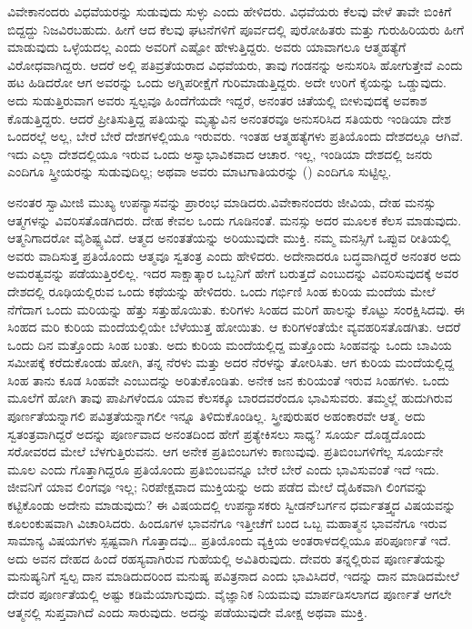  ವಿವೇಕಾನಂದರು ವಿಧವೆಯರನ್ನು ಸುಡುವುದು ಸುಳ್ಳು ಎಂದು ಹೇಳಿದರು. ವಿಧವೆಯರು ಕೆಲವು ವೇಳೆ ತಾವೇ ಬಿಂಕಿಗೆ ಬಿದ್ದದ್ದು ನಿಜವಿರಬಹುದು. ಹೀಗೆ ಆದ ಕೆಲವು ಘಟನೆಗಳಿಗೆ ಪೂರ್ವದಲ್ಲಿ ಪುರೋಹಿತರು ಮತ್ತು ಗುರುಹಿರಿಯರು ಹೀಗೆ ಮಾಡುವುದು ಒಳ್ಳೆಯದಲ್ಲ ಎಂದು ಅವರಿಗೆ ಎಷ್ಟೋ ಹೇಳುತ್ತಿದ್ದರು. ಅವರು ಯಾವಾಗಲೂ ಆತ್ಮಹತ್ಯೆಗೆ ವಿರೋಧವಾಗಿದ್ದರು. ಆದರೆ ಅಲ್ಲಿ ಪತಿವ್ರತೆಯರಾದ ವಿಧವೆಯರು, ತಾವು ಗಂಡನನ್ನು ಅನುಸರಿಸಿ ಹೋಗುತ್ತೇವೆ ಎಂದು ಹಟ ಹಿಡಿದರೋ ಆಗ ಅವರನ್ನು ಒಂದು ಅಗ್ನಿಪರೀಕ್ಷೆಗೆ ಗುರಿಮಾಡುತ್ತಿದ್ದರು. ಅದೇ ಉರಿಗೆ ಕೈಯನ್ನು ಒಡ್ಡುವುದು. ಅದು ಸುಡುತ್ತಿರುವಾಗ ಅವರು ಸ್ವಲ್ಪವೂ ಹಿಂದೆಗೆಯದೇ ಇದ್ದರೆ, ಅನಂತರ ಚಿತೆಯಲ್ಲಿ ಬೀಳುವುದಕ್ಕೆ ಅವಕಾಶ ಕೊಡುತ್ತಿದ್ದರು. ಆದರೆ ಪ್ರೀತಿಸುತ್ತಿದ್ದ ಪತಿಯನ್ನು ಮೃತ್ಯುವಿನ ಅನಂತರವೂ ಅನುಸರಿಸಿದ ಸತಿಯರು ಇಂಡಿಯಾ ದೇಶ ಒಂದರಲ್ಲೆ ಅಲ್ಲ, ಬೇರೆ ಬೇರೆ ದೇಶಗಳಲ್ಲಿಯೂ ಇರುವರು. ಇಂತಹ ಆತ್ಮಹತ್ಯೆಗಳು ಪ್ರತಿಯೊಂದು ದೇಶದಲ್ಲೂ ಆಗಿವೆ. ಇದು ಎಲ್ಲಾ ದೇಶದಲ್ಲಿಯೂ ಇರುವ ಒಂದು ಅಸ್ವಾಭಾವಿಕವಾದ ಆಚಾರ. ಇಲ್ಲ, ಇಂಡಿಯಾ ದೇಶದಲ್ಲಿ ಜನರು ಎಂದಿಗೂ ಸ್ತ್ರೀಯರನ್ನು ಸುಡುವುದಿಲ್ಲ; ಅಥವಾ ಅವರು ಮಾಟಗಾತಿಯರನ್ನು () ಎಂದಿಗೂ ಸುಟ್ಟಿಲ್ಲ. 

 ಅನಂತರ ಸ್ವಾಮೀಜಿ ಮುಖ್ಯ ಉಪನ್ಯಾಸವನ್ನು ಪ್ರಾರಂಭ ಮಾಡಿದರು.\break ವಿವೇಕಾನಂದರು ಜೀವಿಯ, ದೇಹ ಮನಸ್ಸು ಆತ್ಮಗಳನ್ನು ವಿವರಿಸತೊಡಗಿದರು. ದೇಹ ಕೇವಲ ಒಂದು ಗೂಡಿನಂತೆ. ಮನಸ್ಸು ಅದರ ಮೂಲಕ ಕೆಲಸ ಮಾಡುವುದು. ಆತ್ಮನಿಗಾದರೋ ವೈಶಿಷ್ಟ್ಯವಿದೆ. ಆತ್ಮದ ಅನಂತತೆಯನ್ನು ಅರಿಯುವುದೇ ಮುಕ್ತಿ. ನಮ್ಮ ಮನಸ್ಸಿಗೆ ಒಪ್ಪುವ ರೀತಿಯಲ್ಲಿ ಅವರು ವಾದಿಸುತ್ತ ಪ್ರತಿಯೊಂದು ಆತ್ಮವೂ ಸ್ವತಂತ್ರ ಎಂದು ಹೇಳಿದರು. ಅದೇನಾದರೂ ಬದ್ಧವಾಗಿದ್ದರೆ ಅನಂತರ ಅದು ಅಮರತ್ವವನ್ನು ಪಡೆಯುತ್ತಿರಲಿಲ್ಲ. ಇದರ ಸಾಕ್ಷಾತ್ಕಾರ ಒಬ್ಬನಿಗೆ ಹೇಗೆ ಬರುತ್ತದೆ ಎಂಬುದನ್ನು ವಿವರಿಸುವುದಕ್ಕೆ ಅವರ ದೇಶದಲ್ಲಿ ರೂಢಿಯಲ್ಲಿರುವ ಒಂದು ಕಥೆಯನ್ನು ಹೇಳಿದರು. ಒಂದು ಗರ್ಭಿಣಿ ಸಿಂಹ ಕುರಿಯ ಮಂದೆಯ ಮೇಲೆ ನೆಗೆದಾಗ ಒಂದು ಮರಿಯನ್ನು ಹೆತ್ತು ಸತ್ತುಹೊಯಿತು. ಕುರಿಗಳು ಸಿಂಹದ ಮರಿಗೆ ಹಾಲನ್ನು ಕೊಟ್ಟು ಸಂರಕ್ಷಿಸಿದವು. ಈ ಸಿಂಹದ ಮರಿ ಕುರಿಯ ಮಂದೆಯಲ್ಲಿಯೇ ಬೆಳೆಯುತ್ತ ಹೋಯಿತು. ಆ ಕುರಿಗಳಂತೆಯೇ ವ್ಯವಹರಿಸತೊಡಗಿತು. ಆದರೆ ಒಂದು ದಿನ ಮತ್ತೊಂದು ಸಿಂಹ ಬಂತು. ಅದು ಕುರಿಯ ಮಂದೆಯಲ್ಲಿದ್ದ ಮತ್ತೊಂದು ಸಿಂಹವನ್ನು ಒಂದು ಬಾವಿಯ ಸಮೀಪಕ್ಕೆ ಕರೆದುಕೊಂಡು ಹೋಗಿ, ತನ್ನ ನೆರಳು ಮತ್ತು ಅದರ ನೆರಳನ್ನು ತೋರಿಸಿತು. ಆಗ ಕುರಿಯ ಮಂದೆಯಲ್ಲಿದ್ದ ಸಿಂಹ ತಾನು ಕೂಡ ಸಿಂಹವೇ ಎಂಬುದನ್ನು ಅರಿತುಕೊಂಡಿತು. ಅನೇಕ ಜನ ಕುರಿಯಂತೆ ಇರುವ ಸಿಂಹಗಳು. ಒಂದು ಮೂಲೆಗೆ ಹೋಗಿ ತಾವು ಪಾಪಿಗಳೆಂದೂ ಯಾವ ಕೆಲಸಕ್ಕೂ ಬಾರದವರೆಂದೂ ಭಾವಿಸುವರು. ತಮ್ಮಲ್ಲೆ ಹುದುಗಿರುವ ಪೂರ್ಣತೆಯನ್ನಾಗಲಿ ಪವಿತ್ರತೆಯನ್ನಾಗಲೀ ಇನ್ನೂ ತಿಳಿದುಕೊಂಡಿಲ್ಲ. ಸ್ತ್ರೀಪುರುಷರ ಅಹಂಕಾರವೇ ಆತ್ಮ. ಅದು ಸ್ವತಂತ್ರವಾಗಿದ್ದರೆ ಅದನ್ನು ಪೂರ್ಣವಾದ ಅನಂತದಿಂದ ಹೇಗೆ ಪ್ರತ್ಯೇಕಿಸಲು ಸಾಧ್ಯ? ಸೂರ್ಯ ದೊಡ್ಡದೊಂದು ಸರೋವರದ ಮೇಲೆ ಬೆಳಗುತ್ತಿರುವನು. ಆಗ ಅನೇಕ ಪ್ರತಿಬಿಂಬಗಳು ಕಾಣುವುವು. ಪ್ರತಿಬಿಂಬಗಳಿಗೆಲ್ಲ ಸೂರ್ಯನೇ ಮೂಲ ಎಂದು ಗೊತ್ತಾಗಿದ್ದರೂ ಪ್ರತಿಯೊಂದು ಪ್ರತಿಬಿಂಬವನ್ನೂ ಬೇರೆ ಬೇರೆ ಎಂದು ಭಾವಿಸುವಂತೆ ಇದೆ ಇದು. ಜೀವನಿಗೆ ಯಾವ ಲಿಂಗವೂ ಇಲ್ಲ; ನಿರಪೇಕ್ಷವಾದ ಮುಕ್ತಿಯನ್ನು ಅದು ಪಡೆದ ಮೇಲೆ ದೈಹಿಕವಾಗಿ ಲಿಂಗವನ್ನು ಕಟ್ಟಿಕೊಂಡು ಅದೇನು ಮಾಡುವುದು? ಈ ವಿಷಯದಲ್ಲಿ ಉಪನ್ಯಾಸಕರು ಸ್ವೀಡನ್‍ಬರ್ಗನ ಧರ್ಮತತ್ತ್ವದ ವಿಷಯವನ್ನು ಕೂಲಂಕುಷವಾಗಿ ವಿಚಾರಿಸಿದರು. ಹಿಂದೂಗಳ ಭಾವನೆಗೂ ಇತ್ತೀಚೆಗೆ ಬಂದ ಒಬ್ಬ ಮಹಾತ್ಮನ ಭಾವನೆಗೂ ಇರುವ ಸಾಮಾನ್ಯ ವಿಷಯಗಳು ಸ್ಪಷ್ಟವಾಗಿ ಗೊತ್ತಾದವು… ಪ್ರತಿಯೊಂದು ವ್ಯಕ್ತಿಯ ಅಂತರಾಳದಲ್ಲಿಯೂ ಪರಿಪೂರ್ಣತೆ ಇದೆ. ಅದು ಅವನ ದೇಹದ ಹಿಂದೆ ರಹಸ್ಯವಾಗಿರುವ ಗುಹೆಯಲ್ಲಿ ಅವಿತಿರುವುದು. ದೇವರು ತನ್ನಲ್ಲಿರುವ ಪೂರ್ಣತೆಯನ್ನು ಮನುಷ್ಯನಿಗೆ ಸ್ವಲ್ಪ ದಾನ ಮಾಡಿದುದರಿಂದ ಮನುಷ್ಯ ಪವಿತ್ರನಾದ ಎಂದು ಭಾವಿಸಿದರೆ, ಇದನ್ನು ದಾನ ಮಾಡಿದಮೇಲೆ ದೇವರ ಪೂರ್ಣತೆಯಲ್ಲಿ ಅಷ್ಟು ಕಡಿಮೆಯಾಗುವುದು. ವೈಜ್ಞಾನಿಕ ನಿಯಮವು ಮಾರ್ಪಡಿಸಲಾಗದ ಪೂರ್ಣತೆ ಆಗಲೇ ಆತ್ಮನಲ್ಲಿ ಸುಪ್ತವಾಗಿದೆ ಎಂದು ಸಾರುವುದು. ಅದನ್ನು ಪಡೆಯುವುದೇ ಮೋಕ್ಷ ಅಥವಾ ಮುಕ್ತಿ. 

